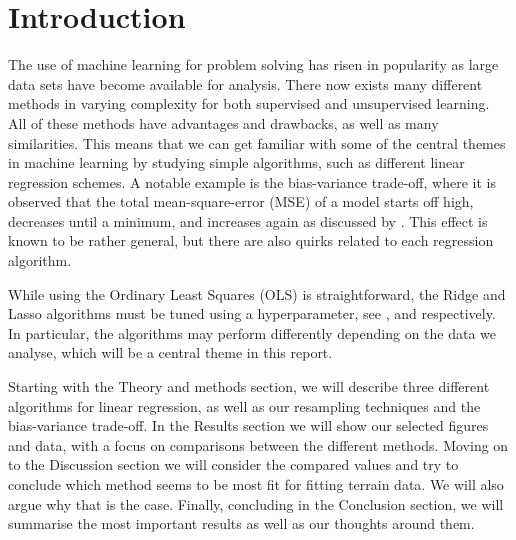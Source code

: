 \section{Introduction}
\label{sec:introduction}

The use of machine learning for problem solving has risen in popularity as large data sets have become available for analysis. There now exists many different methods in varying complexity for both supervised and unsupervised learning. All of these methods have advantages and drawbacks, as well as many similarities. This means that we can get familiar with some of the central themes in machine learning by studying simple algorithms, such as different linear regression schemes. A notable example is the bias-variance trade-off, where it is observed that the total mean-square-error (MSE) of a model starts off high, decreases until a minimum, and increases again as discussed by \citet{hastie2009elements}. This effect is known to be rather general, but there are also quirks related to each regression algorithm.

While using the Ordinary Least Squares (OLS) is straightforward, the Ridge and Lasso algorithms must be tuned using a hyperparameter, see \citet{hoerl1970ridge}, and \citet{tibshirani1996lasso} respectively. In particular, the algorithms may perform differently depending on the data we analyse, which will be a central theme in this report.

Starting with the Theory and methods section, we will describe three different algorithms for linear regression, as well as our resampling techniques and the bias-variance trade-off. In the Results section we will show our selected figures and data, with a focus on comparisons between the different methods. Moving on to the Discussion section we will consider the compared values and try to conclude which method seems to be most fit for fitting terrain data. We will also argue why that is the case. Finally, concluding in the Conclusion section, we will summarise the most important results as well as our thoughts around them.